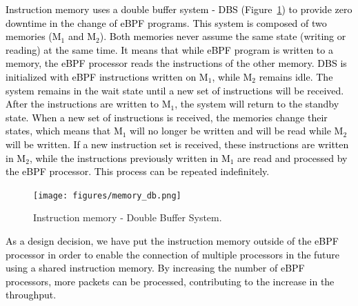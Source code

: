 \textcolor{black}{Instruction memory uses a double buffer system - DBS (Figure~\ref{fig:mem_db}) to provide zero downtime in the change of eBPF programs. This system is composed of two memories (M$_{1}$ and M$_{2}$). Both memories never assume the same state (writing or reading) at the same time. It means that while eBPF program is written to a memory, the eBPF processor reads the instructions of the other memory. DBS is initialized with eBPF instructions written on M$_{1}$, while M$_{2}$ remains idle. The system remains in the wait state until a new set of instructions will be received. After the instructions are written to M$_{1}$, the system will return to the standby state. When a new set of instructions is received, the memories change their states, which means that M$_{1}$ will no longer be written and will be read while M$_{2}$ will be written. If a new instruction set is received, these instructions are written in M$_{2}$, while the instructions previously written in M$_{1}$ are read and processed by the eBPF processor. This process can be repeated indefinitely.} 

\begin{figure}[ht]
\centering
\texttt{[image: figures/memory\_db.png]}
\caption{Instruction memory - Double Buffer System.}
\label{fig:mem_db}
\end{figure}

\textcolor{black}{As a design decision, we have put the instruction memory outside of the eBPF processor in order to enable the connection of multiple processors in the future using a shared instruction memory. By increasing the number of eBPF processors, more packets can be processed, contributing to the increase in the throughput.}


